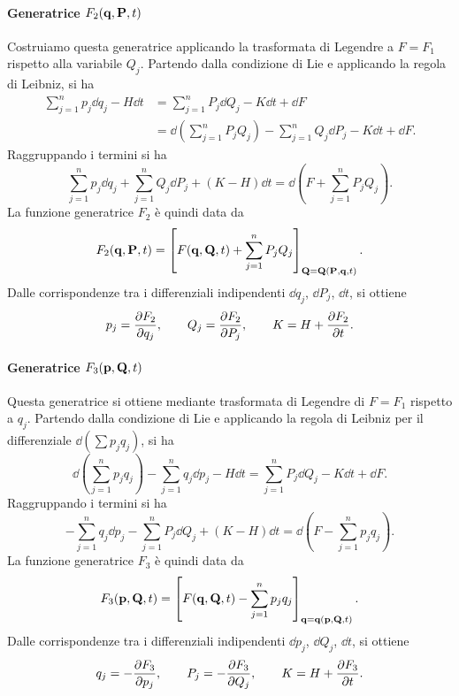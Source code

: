 \paragraph{Generatrice $F_2(\vb{q}, \vb{P}, t)$}
Costruiamo questa generatrice applicando la trasformata di Legendre a $F=F_1$ rispetto alla variabile $Q_j$. Partendo dalla condizione di Lie e applicando la regola di Leibniz, si ha
\begin{align*}
    \sum_{j=1}^n p_j \dd{q_j} - H \dd{t} &= \sum_{j=1}^n P_j\dd{Q_j} - K\dd{t} + \dd{F} \\
    &= \dd{\left(\sum_{j=1}^n P_j Q_j\right)} - \sum_{j=1}^n Q_j \dd{P_j} - K\dd{t} + \dd{F}.
\end{align*}
Raggruppando i termini si ha
\begin{equation*}
    \sum_{j=1}^n p_j \dd{q_j} + \sum_{j=1}^n Q_j \dd{P_j} 
    + (K - H)\dd{t} = \dd{\left(F + \sum_{j=1}^n P_j Q_j\right)}.
\end{equation*}
La funzione generatrice $F_2$ è quindi data da
\begin{equation*}
    F_2(\vb{q}, \vb{P}, t) = \left[ F(\vb{q}, \vb{Q}, t) + \sum_{j=1}^n P_j Q_j \right]_{\vb{Q} = \vb{Q}(\vb{P}, \vb{q}, t)}.
\end{equation*}
Dalle corrispondenze tra i differenziali indipendenti $\dd{q_j}$, $\dd{P_j}$, $\dd{t}$, si ottiene
\begin{equation*}
    p_j = \pdv{F_2}{q_j}, \qquad
    Q_j = \pdv{F_2}{P_j}, \qquad
    K = H + \pdv{F_2}{t}.
\end{equation*}

\paragraph{Generatrice $F_3(\vb{p}, \vb{Q}, t)$}
Questa generatrice si ottiene mediante trasformata di Legendre di $F=F_1$ rispetto a $q_j$. Partendo dalla condizione di Lie e applicando la regola di Leibniz per il differenziale $\dd(\sum p_j q_j)$, si ha
\begin{equation*}
    \dd{\left(\sum_{j=1}^n p_j q_j\right)} - \sum_{j=1}^n q_j \dd{p_j} - H\dd{t} = \sum_{j=1}^n P_j \dd{Q_j} - K \dd{t} + \dd{F}.
\end{equation*}
Raggruppando i termini si ha
\begin{equation*}
    - \sum_{j=1}^n q_j \dd{p_j} - \sum_{j=1}^n P_j \dd{Q_j} + (K - H)\dd{t} = \dd{\left(F - \sum_{j=1}^n p_j q_j\right)}.
\end{equation*}
La funzione generatrice $F_3$ è quindi data da
\begin{equation*}
    F_3(\vb{p}, \vb{Q}, t) = \left[ F(\vb{q}, \vb{Q}, t) - \sum_{j=1}^n p_j q_j \right]_{\vb{q} = \vb{q}(\vb{p}, \vb{Q}, t)}.
\end{equation*}
Dalle corrispondenze tra i differenziali indipendenti $\dd{p_j}$, $\dd{Q_j}$, $\dd{t}$, si ottiene
\begin{equation*}
    q_j = - \pdv{F_3}{p_j}, \qquad
    P_j = -\pdv{F_3}{Q_j}, \qquad
    K = H + \pdv{F_3}{t}.
\end{equation*}


